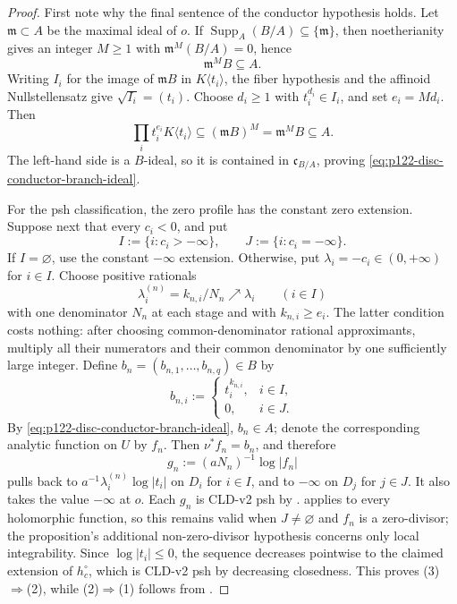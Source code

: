 \begin{proof}
First note why the final sentence of the conductor hypothesis holds.  Let
\(\mathfrak m\subset A\) be the maximal ideal of \(o\).  If
\(\operatorname{Supp}_A(B/A)\subseteq\{\mathfrak m\}\), then noetherianity
gives an integer \(M\geq1\) with
\(\mathfrak m^M(B/A)=0\), hence
\[
                            \mathfrak m^M B\subseteq A.
\]
Writing \(I_i\) for the image of \(\mathfrak mB\) in
\(K\langle t_i\rangle\), the fiber hypothesis and the affinoid
Nullstellensatz give \(\sqrt{I_i}=(t_i)\).  Choose \(d_i\geq1\) with
\(t_i^{d_i}\in I_i\), and set \(e_i=Md_i\).  Then
\[
 \prod_i t_i^{e_i}K\langle t_i\rangle
       \subseteq (\mathfrak mB)^M=\mathfrak m^M B\subseteq A.
\]
The left-hand side is a \(B\)-ideal, so it is contained in
\(\mathfrak c_{B/A}\), proving
\eqref{eq:p122-disc-conductor-branch-ideal}.

For the psh classification, the zero profile has the constant zero
extension.  Suppose next that every \(c_i<0\), and put
\[
 I:=\{i:c_i> -\infty\},\qquad J:=\{i:c_i=-\infty\}.
\]
If \(I=\varnothing\), use the constant \(-\infty\) extension.  Otherwise,
put \(\lambda_i=-c_i\in(0,+\infty)\) for \(i\in I\).  Choose positive
rationals
\[
                  \lambda_i^{(n)}=k_{n,i}/N_n\nearrow\lambda_i
                  \qquad(i\in I)
\]
with one denominator \(N_n\) at each stage and with
\(k_{n,i}\geq e_i\).  The latter condition costs nothing: after choosing
common-denominator rational approximants, multiply all their numerators and
their common denominator by one sufficiently large integer.  Define
\(b_n=(b_{n,1},\ldots,b_{n,q})\in B\) by
\[
 b_{n,i}:=
 \begin{cases}
   t_i^{k_{n,i}},&i\in I,\\
   0,&i\in J.
 \end{cases}
\]
By \eqref{eq:p122-disc-conductor-branch-ideal}, \(b_n\in A\); denote the
corresponding analytic function on \(U\) by \(f_n\).  Then
\(\nu^*f_n=b_n\), and therefore
\[
 g_n:=(aN_n)^{-1}\log|f_n|
\]
pulls back to
\(a^{-1}\lambda_i^{(n)}\log|t_i|\) on \(D_i\) for \(i\in I\), and to
\(-\infty\) on \(D_j\) for \(j\in J\).  It also takes the value
\(-\infty\) at \(o\).  Each \(g_n\) is CLD-v2 psh by
.
 applies to every holomorphic function, so
this remains valid when \(J\ne\varnothing\) and \(f_n\) is a zero-divisor;
the proposition's additional non-zero-divisor hypothesis concerns only local
integrability.  Since \(\log|t_i|\leq0\), the sequence decreases pointwise
to the claimed
extension of \(h_c^\circ\), which is CLD-v2 psh by decreasing closedness.
This proves (3)\(\Rightarrow\)(2), while (2)\(\Rightarrow\)(1) follows from
.


\end{proof}
